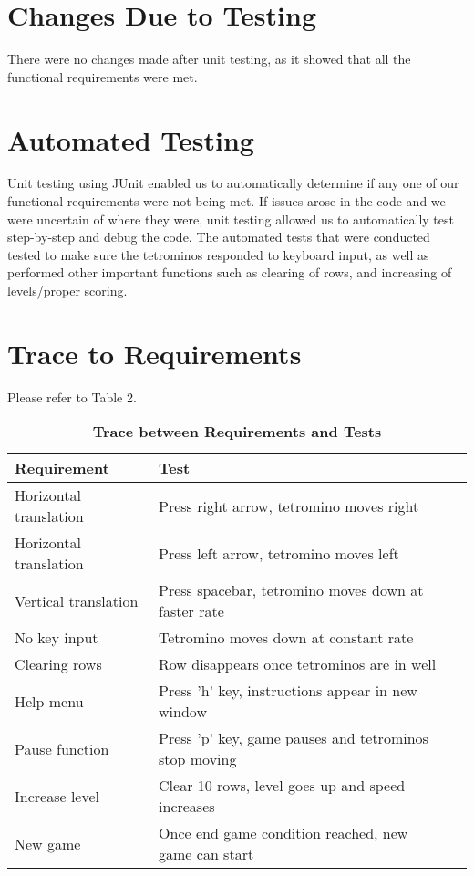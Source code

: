\documentclass[12pt, titlepage]{article}
\begin{document}
\section{Changes Due to Testing}
There were no changes made after unit testing, as it showed that all the functional requirements were met.
\section{Automated Testing}
Unit testing using JUnit enabled us to automatically determine if any one of our functional requirements were not being met. If issues arose in the code and we were uncertain of where they were, unit testing allowed us to automatically test step-by-step and debug the code. The automated tests that were conducted tested to make sure the tetrominos responded to keyboard input, as well as performed other important functions such as clearing of rows, and increasing of levels/proper scoring.
\section{Trace to Requirements}
 Please refer to Table 2.

\begin{table}[bp]
\caption{\bf Trace between Requirements and Tests}
\begin{tabularx}{\textwidth}{p{4cm}p{15cm}X}
\toprule {\bf Requirement} & {\bf Test}\\
\midrule
Horizontal translation & Press right arrow, tetromino moves right\\
Horizontal translation & Press left arrow, tetromino moves left\\
Vertical translation & Press spacebar, tetromino moves down at faster rate\\
No key input & Tetromino moves down at constant rate\\
Clearing rows & Row disappears once tetrominos are in well\\
Help menu & Press 'h' key, instructions appear in new window\\
Pause function & Press 'p' key, game pauses and tetrominos stop moving\\
Increase level & Clear 10 rows, level goes up and speed increases\\
New game & Once end game condition reached, new game can start\\
\bottomrule
\end{tabularx}
\end{table}
\end{document}
